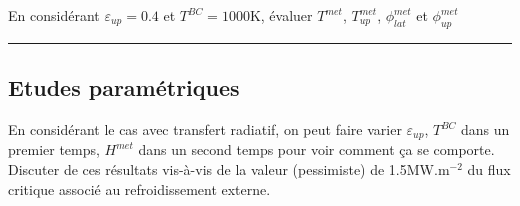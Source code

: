 \documentclass[3p]{elsarticle}
\newenvironment{remark}[1][\textit{Nota Bene}]{\begin{trivlist}
\item[\hskip \labelsep {\bfseries \rule{1ex}{1ex} #1}]\ignorespaces}{\rule{1ex}{1ex} \end{trivlist}\ignorespacesafterend}
\newcounter{question}
\newcommand{\Q}[1]{\stepcounter{question}\begin{remark}[Q\arabic{question}]#1~~\end{remark}}
\begin{document}
\Q{En considérant $\varepsilon_{up} = 0.4$ et $T^{BC}=1000$K, évaluer \(T^{met}\), \(T_{up}^{met}\), \(\phi_{lat}^{met}\) et \(\phi_{up}^{met}\)}

\subsection{Etudes paramétriques} \label{sect:param}

En considérant le cas avec transfert radiatif, on peut faire varier $\varepsilon_{up}$, $T^{BC}$ dans un premier temps, $H^{met}$ dans un second temps pour voir comment ça se comporte. Discuter de ces résultats vis-à-vis de la valeur (pessimiste) de 1.5MW.m$^{-2}$ du flux critique associé au refroidissement externe.


\end{document}
